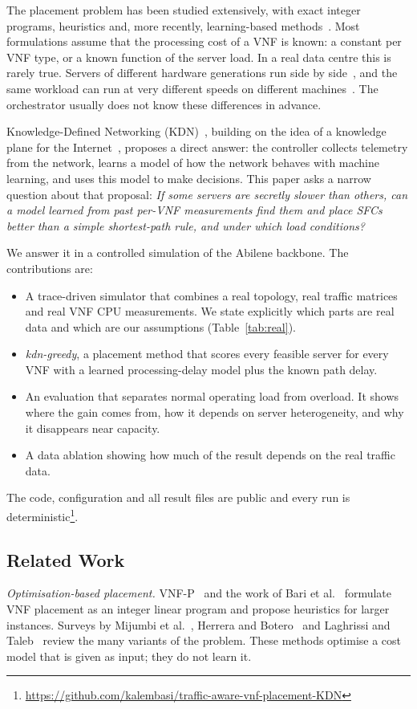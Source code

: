 \documentclass[conference,a4paper]{IEEEtran}
\begin{document}
The placement problem has been studied extensively, with exact integer programs, heuristics and, more recently,
learning-based methods~\cite{herrera2016resource,laghrissi2019survey}. Most formulations assume that the
processing cost of a VNF is known: a constant per VNF type, or a known function of the server load. In a real data
centre this is rarely true. Servers of different hardware generations run side by side~\cite{reiss2012heterogeneity},
and the same workload can run at very different speeds on different machines~\cite{delimitrou2013paragon}. The
orchestrator usually does not know these differences in advance.

Knowledge-Defined Networking (KDN)~\cite{mestres2017kdn}, building on the idea of a knowledge plane for the
Internet~\cite{clark2003knowledge}, proposes a direct answer: the controller collects telemetry from the network,
learns a model of how the network behaves with machine learning, and uses this model to make decisions. This paper
asks a narrow question about that proposal:
\emph{If some servers are secretly slower than others, can a model learned from past per-VNF measurements find
them and place SFCs better than a simple shortest-path rule, and under which load conditions?}

We answer it in a controlled simulation of the Abilene backbone. The contributions are:
\begin{itemize}
\item A trace-driven simulator that combines a real topology, real traffic matrices and real VNF CPU measurements.
We state explicitly which parts are real data and which are our assumptions (Table~\ref{tab:real}).
\item \emph{kdn-greedy}, a placement method that scores every feasible server for every VNF with a learned
processing-delay model plus the known path delay.
\item An evaluation that separates normal operating load from overload. It shows where the gain comes from, how it
depends on server heterogeneity, and why it disappears near capacity.
\item A data ablation showing how much of the result depends on the real traffic data.
\end{itemize}
The code, configuration and all result files are public and every run is deterministic\footnote{\url{https://github.com/kalembasi/traffic-aware-vnf-placement-KDN}}.

\subsection*{Related Work}
\emph{Optimisation-based placement.} VNF-P~\cite{moens2014vnfp} and the work of Bari et al.~\cite{bari2015orchestrating}
formulate VNF placement as an integer linear program and propose heuristics for larger instances. Surveys by
Mijumbi et al.~\cite{mijumbi2016nfv}, Herrera and Botero~\cite{herrera2016resource} and Laghrissi and
Taleb~\cite{laghrissi2019survey} review the many variants of the problem. These methods optimise a cost model that
is given as input; they do not learn it.
\end{document}
